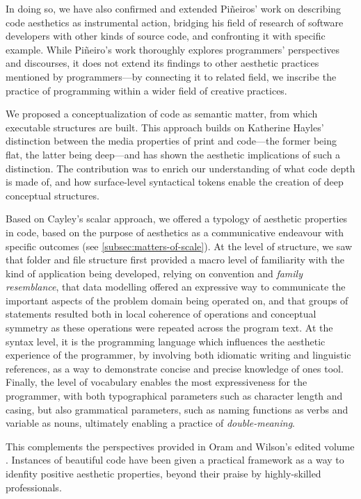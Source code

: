 In doing so, we have also confirmed and extended Piñeiros' work on describing code aesthetics as instrumental action, bridging his field of research of software developers with other kinds of source code, and confronting it with specific example. While Piñeiro's work thoroughly explores programmers' perspectives and discourses, it does not extend its findings to other aesthetic practices mentioned by programmers—by connecting it to related field, we inscribe the practice of programming within a wider field of creative practices.

We proposed a conceptualization of code as semantic matter, from which executable structures are built. This approach builds on Katherine Hayles' distinction between the media properties of print and code—the former being flat, the latter being deep—and has shown the aesthetic implications of such a distinction. The contribution was to enrich our understanding of what code depth is made of, and how surface-level syntactical tokens enable the creation of deep conceptual structures.

Based on Cayley's scalar approach, we offered a typology of aesthetic properties in code, based on the purpose of aesthetics as a communicative endeavour with specific outcomes (see \autoref{subsec:matters-of-scale}). At the level of structure, we saw that folder and file structure first provided a macro level of familiarity with the kind of application being developed, relying on convention and \emph{family resemblance}, that data modelling offered an expressive way to communicate the important aspects of the problem domain being operated on, and that groups of statements resulted both in local coherence of operations and conceptual symmetry as these operations were repeated across the program text. At the syntax level, it is the programming language which influences the aesthetic experience of the programmer, by involving both idiomatic writing and linguistic references, as a way to demonstrate concise and precise knowledge of ones tool. Finally, the level of vocabulary enables the most expressiveness for the programmer, with both typographical parameters such as character length and casing, but also grammatical parameters, such as naming functions as verbs and variable as nouns, ultimately enabling a practice of \emph{double-meaning}.

This complements the perspectives provided in Oram and Wilson's edited volume \citep{oram_beautiful_2007}. Instances of beautiful code have been given a practical framework as a way to idenfity positive aesthetic properties, beyond their praise by highly-skilled professionals.


